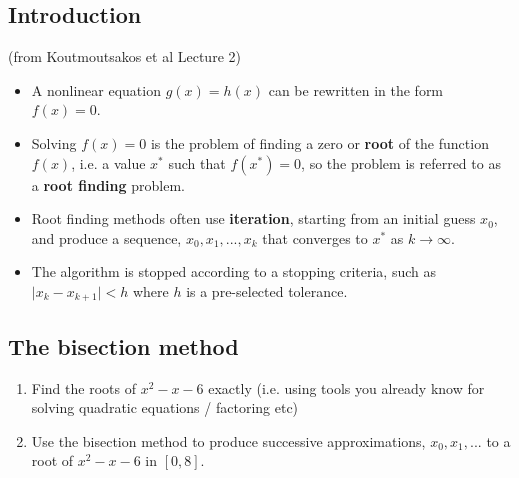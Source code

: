 \documentclass[12pt,letterpaper,noanswers]{exam}
\begin{document}
\subsection*{Introduction}


\begin{tcolorbox}
(from Koutmoutsakos et al Lecture 2)

\begin{itemize}
\itemsep0pt
    \item A nonlinear equation $g(x) = h(x)$ can be rewritten in the form $f(x) = 0$.
    \item Solving $f(x) = 0$ is the problem of finding a zero or \textbf{root} of the function $f(x)$, i.e. a value $x^*$ such that $f(x^*) = 0$, so the problem is referred to as a \textbf{root finding} problem.
\end{itemize}
\end{tcolorbox}

\begin{tcolorbox}
\begin{itemize}
\itemsep0pt
    \item Root finding methods often use \textbf{iteration}, starting from an initial guess $x_0$, and produce a sequence, $x_0, x_1, ..., x_k$ that converges to $x^*$ as $k\rightarrow \infty$.
    \item The algorithm is stopped according to a stopping criteria, such as $\vert x_k - x_{k+1}\vert < h$ where $h$ is a pre-selected tolerance.
\end{itemize}
\end{tcolorbox}

\subsection*{The bisection method}

\begin{enumerate}[resume=classQ]
\item Find the roots of $x^2-x-6$ exactly (i.e. using tools you already know for solving quadratic equations / factoring etc)
\item Use the bisection method to produce successive approximations, $x_0, x_1, ...$ to a root of $x^2-x-6$ in $[0,8]$.

\end{enumerate}
\end{document}
